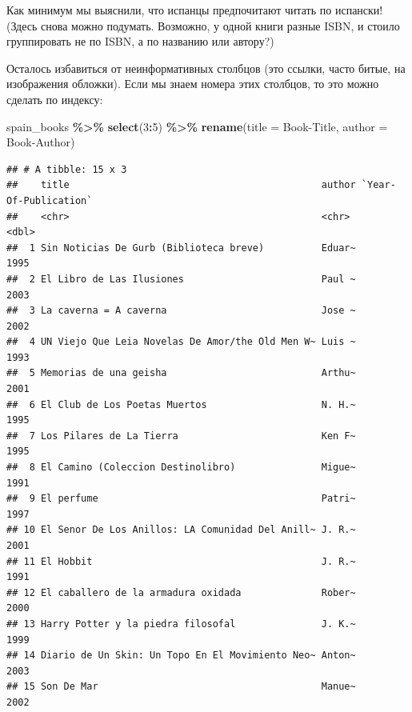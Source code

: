\documentclass[
]{book}
\newenvironment{Shaded}{\begin{snugshade}}{\end{snugshade}}
\newcommand{\AttributeTok}[1]{\textcolor[rgb]{0.13,0.29,0.53}{#1}}
\newcommand{\DecValTok}[1]{\textcolor[rgb]{0.00,0.00,0.81}{#1}}
\newcommand{\FunctionTok}[1]{\textcolor[rgb]{0.13,0.29,0.53}{\textbf{#1}}}
\newcommand{\NormalTok}[1]{#1}
\newcommand{\SpecialCharTok}[1]{\textcolor[rgb]{0.81,0.36,0.00}{\textbf{#1}}}
\newcommand{\StringTok}[1]{\textcolor[rgb]{0.31,0.60,0.02}{#1}}
\theoremstyle{definition}
\theoremstyle{definition}
\theoremstyle{definition}
\theoremstyle{definition}
\theoremstyle{remark}
\begin{document}
Как минимум мы выяснили, что испанцы предпочитают читать по испански! (Здесь снова можно подумать. Возможно, у одной книги разные ISBN, и стоило группировать не по ISBN, а по названию или автору?)

Осталось избавиться от неинформативных столбцов (это ссылки, часто битые, на изображения обложки). Если мы знаем номера этих столбцов, то это можно сделать по индексу:

\begin{Shaded}
\begin{Highlighting}[]
\NormalTok{spain\_books }\SpecialCharTok{\%\textgreater{}\%} 
  \FunctionTok{select}\NormalTok{(}\DecValTok{3}\SpecialCharTok{:}\DecValTok{5}\NormalTok{) }\SpecialCharTok{\%\textgreater{}\%} 
  \FunctionTok{rename}\NormalTok{(}\AttributeTok{title =} \StringTok{\textasciigrave{}}\AttributeTok{Book{-}Title}\StringTok{\textasciigrave{}}\NormalTok{, }\AttributeTok{author =} \StringTok{\textasciigrave{}}\AttributeTok{Book{-}Author}\StringTok{\textasciigrave{}}\NormalTok{)}
\end{Highlighting}
\end{Shaded}

\begin{verbatim}
## # A tibble: 15 x 3
##    title                                            author `Year-Of-Publication`
##    <chr>                                            <chr>                  <dbl>
##  1 Sin Noticias De Gurb (Biblioteca breve)          Eduar~                  1995
##  2 El Libro de Las Ilusiones                        Paul ~                  2003
##  3 La caverna = A caverna                           Jose ~                  2002
##  4 UN Viejo Que Leia Novelas De Amor/the Old Men W~ Luis ~                  1993
##  5 Memorias de una geisha                           Arthu~                  2001
##  6 El Club de Los Poetas Muertos                    N. H.~                  1995
##  7 Los Pilares de La Tierra                         Ken F~                  1995
##  8 El Camino (Coleccion Destinolibro)               Migue~                  1991
##  9 El perfume                                       Patri~                  1997
## 10 El Senor De Los Anillos: LA Comunidad Del Anill~ J. R.~                  2001
## 11 El Hobbit                                        J. R.~                  1991
## 12 El caballero de la armadura oxidada              Rober~                  2000
## 13 Harry Potter y la piedra filosofal               J. K.~                  1999
## 14 Diario de Un Skin: Un Topo En El Movimiento Neo~ Anton~                  2003
## 15 Son De Mar                                       Manue~                  2002
\end{verbatim}
\end{document}
